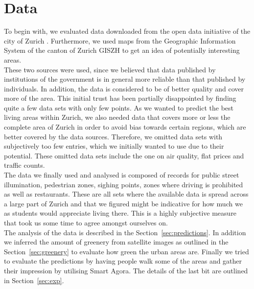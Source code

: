 \documentclass[letterpaper]{article}
\begin{document}
\section{Data}\label{sec:data}
To begin with, we evaluated data downloaded from the open data initiative of the city of Zurich \cite{ZurichOD}. 
Furthermore, we used maps from the Geographic Information System of the canton of Zurich GISZH \cite{GISZH} 
to get an idea of potentially interesting areas.\\
\indent These two sources were used, since we believed that data published by institutions of the government 
is in general more reliable than that published by individuals. In addition, the data is considered to be of better 
quality and cover more of the area. This initial trust has been partially disappointed by finding quite a few data 
sets with only few points. As we wanted to predict the best living areas within Zurich, we also needed data that covers 
more or less the complete area of Zurich in order to avoid bias towards certain regions, which are better covered 
by the data sources. Therefore, we omitted data sets with subjectively too few entries, which we initially wanted 
to use due to their potential. These omitted data sets include the one on air quality, flat prices and traffic counts.\\
\indent The data we finally used and analysed is composed of records for public street illumination, pedestrian zones, 
sighing points, zones where driving is prohibited as well as restaurants. These are all sets where the available data 
is spread across a large part of Zurich and that we figured might be indicative for how much we as students would 
appreciate living there. This is a highly subjective measure that took us some time to agree amongst ourselves on.\\
\indent The analysis of the data is described in the Section~\ref{sec:predictions}. In addition we inferred the amount 
of greenery from satellite images as outlined in the Section~\ref{sec:greenery} to evaluate how green the urban areas are. 
Finally we tried to evaluate the predictions by having people walk some of the areas and gather their impression 
by utilising Smart Agora. The details of the last bit are outlined in Section~\ref{sec:exp}.
\end{document}
